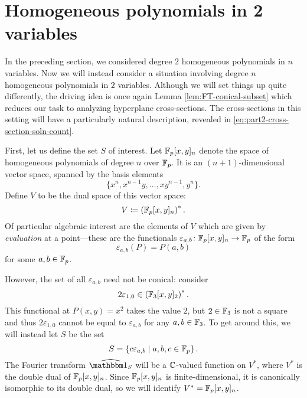 \section{Homogeneous polynomials in 2 variables}\label{sec:part2}
In the preceding section, we considered degree $2$ homogeneous polynomials in $n$ variables. Now we will instead consider a situation involving degree $n$ homogeneous polynomials in $2$ variables. Although we will set things up quite differently, the driving idea is once again Lemma \ref{lem:FT-conical-subset} which reduces our task to analyzing hyperplane cross-sections. The cross-sections in this setting will have a particularly natural description, revealed in \eqref{eq:part2-cross-section-soln-count}.

First, let us define the set $S$ of interest. Let $\mathbb{F}_p[x,y]_n$ denote the space of homogeneous polynomials of degree $n$ over $\mathbb{F}_p$. It is an $(n+1)$-dimensional vector space, spanned by the basis elements
\[
	\{x^n, x^{n-1}y, \ldots, xy^{n-1}, y^n\}.
\]
Define $V$ to be the dual space of this vector space:
\[
	V \coloneqq \left(\mathbb{F}_p[x,y]_n\right)^*.
\]
Of particular algebraic interest are the elements of $V$ which are given by \emph{evaluation} at a point---these are the functionals $\varepsilon_{a,b}\colon \mathbb{F}_p[x,y]_n \to \mathbb{F}_p$ of the form
\[
	\varepsilon_{a,b}(P) = P(a,b) 
\]
for some $a,b\in \mathbb{F}_p$.

However, the set of all $\varepsilon_{a,b}$ need not be conical: consider
\[
	2\varepsilon_{1,0} \in \left(\mathbb{F}_3[x,y]_2\right)^*.
\]
This functional at $P(x,y) = x^2$ takes the value $2$, but $2\in \mathbb{F}_3$ is not a square and thus $2\varepsilon_{1,0}$ cannot be equal to $\varepsilon_{a,b}$ for any $a,b\in \mathbb{F}_3$. To get around this, we will instead let $S$ be the set
\begin{equation}\label{eq:part2-defn-S}
	S=\left\{c\varepsilon_{a,b} \mid a,b,c \in \mathbb{F}_p\right\}.
\end{equation}
The Fourier transform $\widehat{\IND_S}$ will be a $\mathbb{C}$-valued function on $V^*$, where $V^*$ is the double dual of $\mathbb{F}_p[x,y]_n$. Since $\mathbb{F}_p[x,y]_n$ is finite-dimensional, it is canonically isomorphic to its double dual, so we will identify $V^* = \mathbb{F}_p[x,y]_n$.


